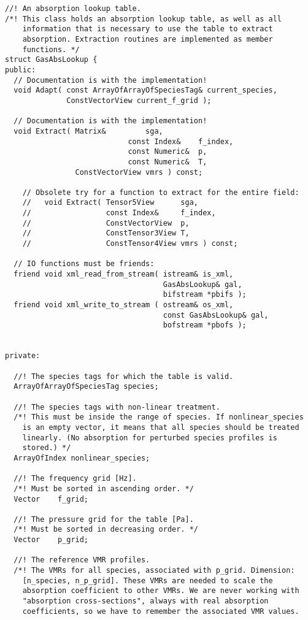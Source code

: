 {\footnotesize
\begin{verbatim}
//! An absorption lookup table.
/*! This class holds an absorption lookup table, as well as all
    information that is necessary to use the table to extract
    absorption. Extraction routines are implemented as member
    functions. */
struct GasAbsLookup {
public:
  // Documentation is with the implementation!
  void Adapt( const ArrayOfArrayOfSpeciesTag& current_species,
              ConstVectorView current_f_grid );

  // Documentation is with the implementation!
  void Extract( Matrix&         sga,
                            const Index&    f_index,
                            const Numeric&  p,
                            const Numeric&  T,
                ConstVectorView vmrs ) const;

    // Obsolete try for a function to extract for the entire field:
    //   void Extract( Tensor5View      sga,
    //                 const Index&     f_index,
    //                 ConstVectorView  p,
    //                 ConstTensor3View T,
    //                 ConstTensor4View vmrs ) const;

  // IO functions must be friends:
  friend void xml_read_from_stream( istream& is_xml,
                                    GasAbsLookup& gal,
                                    bifstream *pbifs );
  friend void xml_write_to_stream ( ostream& os_xml,
                                    const GasAbsLookup& gal,
                                    bofstream *pbofs );


private:

  //! The species tags for which the table is valid.
  ArrayOfArrayOfSpeciesTag species; 

  //! The species tags with non-linear treatment.
  /*! This must be inside the range of species. If nonlinear_species
    is an empty vector, it means that all species should be treated
    linearly. (No absorption for perturbed species profiles is 
    stored.) */
  ArrayOfIndex nonlinear_species; 

  //! The frequency grid [Hz].
  /*! Must be sorted in ascending order. */
  Vector    f_grid;

  //! The pressure grid for the table [Pa].
  /*! Must be sorted in decreasing order. */
  Vector    p_grid;  

  //! The reference VMR profiles.
  /*! The VMRs for all species, associated with p_grid. Dimension:
    [n_species, n_p_grid]. These VMRs are needed to scale the
    absorption coefficient to other VMRs. We are never working with
    "absorption cross-sections", always with real absorption 
    coefficients, so we have to remember the associated VMR values. 


\end{verbatim}}
